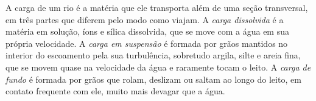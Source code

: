 \begin{definition}\label{def:b1:erosion-transport:load}
A carga de um rio é a matéria que ele transporta além de uma seção transversal, em três partes que diferem pelo modo como viajam. A \emph{carga dissolvida} é a matéria em solução, íons e sílica dissolvida, que se move com a água em sua própria velocidade. A \emph{carga em suspensão} é formada por grãos mantidos no interior do escoamento pela sua turbulência, sobretudo argila, silte e areia fina, que se movem quase na velocidade da água e raramente tocam o leito. A \emph{carga de fundo} é formada por grãos que rolam, deslizam ou saltam ao longo do leito, em contato frequente com ele, muito mais devagar que a água.
\end{definition}

